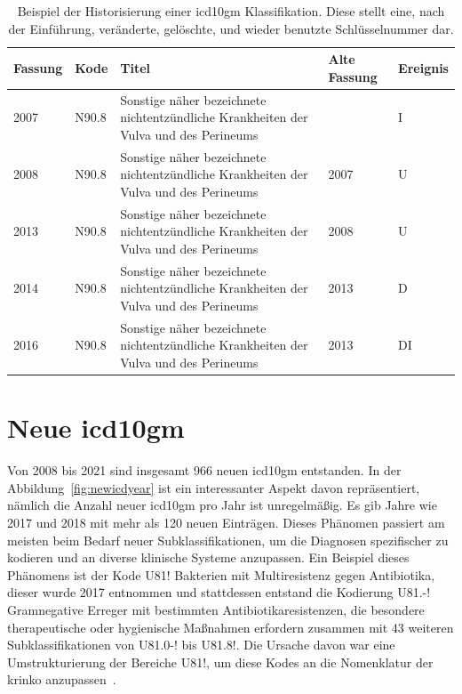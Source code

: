 \begin{table}[ht]
	\centering
	\small
	\caption[Beispiel der Historisierung einer \acs{icd10gm} Klassifikation]{Beispiel der Historisierung einer \acs{icd10gm} Klassifikation. Diese stellt eine, nach der Einführung, veränderte, gelöschte, und wieder benutzte Schlüsselnummer dar.}
	\label{tab:IUDDI}
	\begin{tabular}{|l|l|p{6cm}|l|l|}
		\hline
		\rowcolor{lightgray} Fassung & Kode & Titel & Alte Fassung & Ereignis \\ \hline
		2007 & N90.8  & Sonstige näher bezeichnete nichtentzündliche Krankheiten der Vulva und des Perineums &  & I \\ \hline
		2008 & N90.8  & Sonstige näher bezeichnete nichtentzündliche Krankheiten der Vulva und des Perineums & 2007 & U \\ \hline
		2013 & N90.8  & Sonstige näher bezeichnete nichtentzündliche Krankheiten der Vulva und des Perineums & 2008 & U \\ \hline
		2014 & N90.8  & Sonstige näher bezeichnete nichtentzündliche Krankheiten der Vulva und des Perineums & 2013 & D \\ \hline
		2016 & N90.8  & Sonstige näher bezeichnete nichtentzündliche Krankheiten der Vulva und des Perineums & 2013 & DI \\ \hline
	\end{tabular}
\end{table}

\section{Neue \acs{icd10gm}} \label{sec:newicd}

Von 2008 bis 2021 sind insgesamt 966 neuen \ac{icd10gm} entstanden. In der Abbildung~\ref{fig:newicdyear} ist ein interessanter Aspekt davon repräsentiert, nämlich die Anzahl neuer \ac{icd10gm} pro Jahr ist unregelmäßig. Es gib Jahre wie 2017 und 2018 mit mehr als 120 neuen Einträgen. Dieses Phänomen passiert am meisten beim Bedarf neuer Subklassifikationen, um die Diagnosen spezifischer zu kodieren und an diverse klinische Systeme anzupassen. Ein Beispiel dieses Phänomens ist der Kode \textsf{U81!} \textsf{Bakterien mit Multiresistenz gegen Antibiotika}, dieser wurde 2017 entnommen und stattdessen entstand die Kodierung \textsf{U81.-!} \textsf{Gramnegative Erreger mit bestimmten Antibiotikaresistenzen, die besondere therapeutische oder hygienische Maßnahmen erfordern} zusammen mit 43 weiteren Subklassifikationen von \textsf{U81.0-!} bis \textsf{U81.8!}. Die Ursache davon war eine Umstrukturierung der Bereiche \textsf{U81!}, um diese Kodes an die Nomenklatur der \ac{krinko} anzupassen~\cite{erreg17}.

